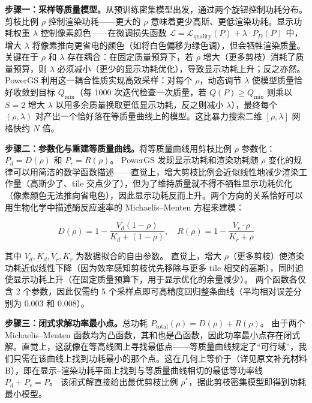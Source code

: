 \textbf{步骤一：采样等质量模型。}从预训练密集模型出发，通过两个旋钮控制功耗分布。剪枝比例 $\rho$ 控制渲染功耗——更大的 $\rho$ 意味着更少高斯、更低渲染功耗。显示功耗权重 $\lambda$ 控制像素颜色——在微调损失函数 $\mathcal{L} = \mathcal{L}_\text{quality}(P) + \lambda \cdot P_D(P)$ 中，增大 $\lambda$ 将像素推向更省电的颜色（如将白色偏移为绿色调），但会牺牲渲染质量。
关键在于 $\rho$ 和 $\lambda$ 存在耦合：在固定质量预算下，若 $\rho$ 增大（更多剪枝）消耗了质量预算，则 $\lambda$ 必须减小（更少的显示功耗优化），导致显示功耗上升；反之亦然。
PowerGS 利用这一耦合性质实现高效采样：对每个 $\rho$，动态调节 $\lambda$ 使模型质量恰好收敛到目标 $Q_{\min}$（每 1000 次迭代检查一次质量，若 $Q(P) \geq Q_{\min}$ 则乘以 $S{=}2$ 增大 $\lambda$ 以用多余质量换取更低显示功耗，反之则减小 $\lambda$），最终每个 $(\rho, \lambda)$ 对产出一个恰好落在等质量曲线上的模型。这比暴力搜索二维 $[\rho, \lambda]$ 网格快约 $N$ 倍。

\textbf{步骤二：参数化与重建等质量曲线。}将等质量曲线用剪枝比例 $\rho$ 参数化：$P_d = D(\rho)$ 和 $P_r = R(\rho)$。
PowerGS 发现显示功耗和渲染功耗随 $\rho$ 变化的规律可以用简洁的数学函数描述——直觉上，增大剪枝比例会近似线性地减少渲染工作量（高斯少了、tile 交点少了），但为了维持质量就不得不牺牲显示功耗优化（像素颜色无法推向省电色），因此显示功耗反而上升。两个方向的关系恰好可以用生物化学中描述酶反应速率的 Michaelis--Menten 方程来建模：

\begin{equation}
D(\rho) = 1 - \frac{V_d(1-\rho)}{K_d + (1-\rho)}, \quad
R(\rho) = 1 - \frac{V_r \cdot \rho}{K_r + \rho}
\end{equation}

其中 $V_d, K_d, V_r, K_r$ 为数据拟合的自由参数。
直觉上，增大 $\rho$（更多剪枝）使渲染功耗近似线性下降（因为效率感知剪枝优先移除与更多 tile 相交的高斯），同时迫使显示功耗上升（在固定质量预算下，用于显示优化的余量减少）。
两个函数各仅含 2 个参数，因此仅需约 5 个采样点即可高精度回归整条曲线（平均相对误差分别为 0.003 和 0.008）。

\textbf{步骤三：闭式求解功率最小点。}总功耗 $P_\text{total}(\rho) = D(\rho) + R(\rho)$。
由于两个 Michaelis--Menten 函数均为凸函数，其和也是凸函数，因此功率最小点存在闭式解。直觉上，这就像在等高线图上寻找最低点——等质量曲线规定了“可行域”，我们只需在该曲线上找到功耗最小的那个点。这在几何上等价于（详见原文补充材料 B），即在显示--渲染功耗平面上找到与等质量曲线相切的最低等功率线 $P_d + P_r = P$。
该闭式解直接给出最优剪枝比例 $\rho^*$，据此剪枝密集模型即得到功耗最小模型。

